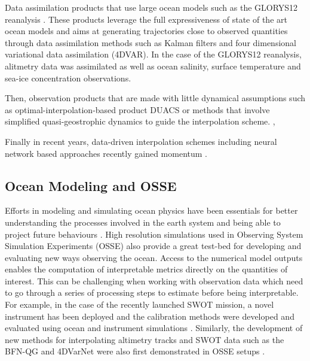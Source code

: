 \begin{bibunit}
Data assimilation products that use large ocean models such as the GLORYS12 reanalysis \cite{jean-michelCopernicusGlobal122021}. These products leverage the full expressiveness of state of the art ocean models and aims at generating trajectories close to observed quantities through data assimilation methods such as Kalman filters and four dimensional variational data assimilation (4DVAR)\cite{carrassiDataAssimilationGeosciences2018}. In the case of the GLORYS12 reanalysis, alitmetry data was assimilated as well as ocean salinity, surface temperature and sea-ice concentration observations.

Then, observation products that are made with little dynamical assumptions such as optimal-interpolation-based product DUACS \cite{taburetDUACSDT2018252019} or methods that involve simplified quasi-geostrophic dynamics to guide the interpolation scheme. \cite{guillouMappingAltimetryForthcoming2021},\cite{ballarottaDynamicMappingAlongTrack2020}

Finally in recent years, data-driven interpolation schemes including neural network based approaches recently gained momentum \cite{alveraazcarateReconstructionIncompleteOceanographic2005,fabletENDTOENDPHYSICSINFORMEDREPRESENTATION2021,ubelmannReconstructingOceanSurface2021}.



\subsection{Ocean Modeling and OSSE}
\label{ssec:oceanmodeling}
Efforts in modeling and simulating ocean physics have been essentials for better understanding the processes involved in the earth system and being able to project future behaviours \cite{bernardImpactPartialSteps2006,ajayiSpatialTemporalVariability2020}. 
High resolution simulations used in Observing System Simulation Experiments (OSSE) also provide a great test-bed for developing and evaluating new ways observing the ocean.
Access to the numerical model outputs enables the computation of interpretable metrics directly on the quantities of interest. This can be challenging when working with observation data which need to go through a series of processing steps to estimate before being interpretable.
For example, in the case of the recently launched SWOT mission, a novel instrument has been deployed and the calibration methods were developed and evaluated using ocean and instrument simulations \cite{dibarboureDataDrivenCalibrationAlgorithm2022}.
Similarly, the development of new methods for interpolating altimetry tracks and SWOT data such as the BFN-QG and 4DVarNet were also first demonstrated in OSSE setups \cite{guillouMappingAltimetryForthcoming2021,fabletENDTOENDPHYSICSINFORMEDREPRESENTATION2021}. 




\end{bibunit}
